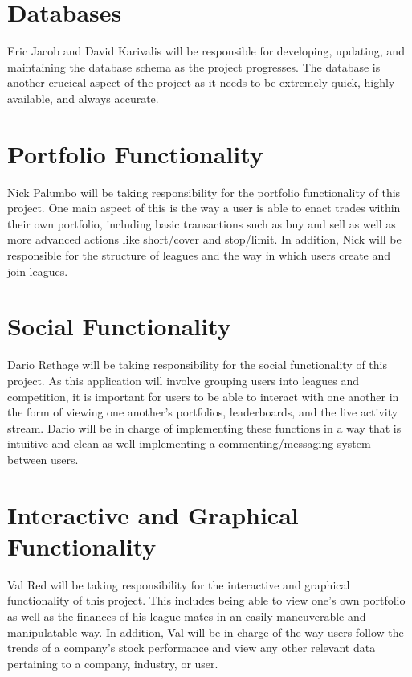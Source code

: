 \documentclass[11pt,letterpaper,oneside]{memoir}
\begin{document}
\section{Databases}

Eric Jacob and David Karivalis will be responsible for developing, updating, and maintaining
the database schema as the project progresses.  The database is another crucical aspect of the
project as it needs to be extremely quick, highly available, and always accurate.

\section{Portfolio Functionality}

Nick Palumbo will be taking responsibility for the portfolio functionality of this project. One main
aspect of this is the way a user is able to enact trades within their own portfolio, including basic
transactions such as buy and sell as well as more advanced actions like short/cover and stop/limit.
In addition, Nick will be responsible for the structure of leagues and the way in which users create
and join leagues.

\section{Social Functionality}

Dario Rethage will be taking responsibility for the social functionality of this project. As this
application will involve grouping users into leagues and competition, it is important for users
to be able to interact with one another in the form of viewing one another's portfolios,
leaderboards, and the live activity stream. Dario will be in charge of implementing these functions
in a way that is intuitive and clean as well implementing a commenting/messaging system
between users.

\section{Interactive and Graphical Functionality}

Val Red will be taking responsibility for the interactive and graphical functionality of this project.
This includes being able to view one's own portfolio as well as the finances of his league mates in
an easily maneuverable and manipulatable way. In addition, Val will be in charge of the way
users follow the trends of a company's stock performance and view any other relevant data
pertaining to a company, industry, or user.
\end{document}
